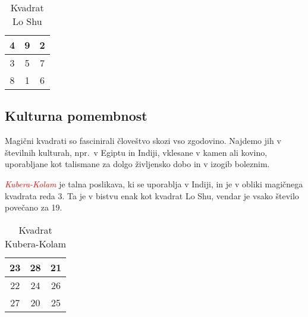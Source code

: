 \documentclass[a4paper,12pt]{article}
\begin{document}
\begin{table}[h]
   \centering
   \caption{Kvadrat Lo Shu}
   \label{table:loshu}
   \begin{tabular}{|c|c|c|}
      \hline
      4 & 9 & 2 \\
      \hline
      3 & 5 & 7 \\
      \hline
      8 & 1 & 6 \\
      \hline
   \end{tabular}
   
\end{table}


\subsection{Kulturna pomembnost}

Magični kvadrati so fascinirali človeštvo skozi vso zgodovino. Najdemo jih
v številnih kulturah, npr.\ v Egiptu in Indiji, vklesane v kamen ali
kovino, uporabljane kot talismane za dolgo življensko dobo in v
izogib boleznim.

\textcolor{red}{\emph{Kubera-Kolam}} je talna poslikava, ki se uporablja v Indiji, in je v
obliki magičnega kvadrata reda 3. Ta je v bistvu enak kot kvadrat
Lo Shu, vendar je vsako število povečano za 19.
\begin{table}[h]
   \centering
   \caption{Kvadrat Kubera-Kolam}
   \label{table:kubera}
   \begin{tabular}{|c|c|c|}
      \hline
      23 & 28 & 21 \\
      \hline
      22 & 24 & 26 \\
      \hline
      27 & 20 & 25 \\
      \hline
      
   \end{tabular}

\end{table}
\end{document}
